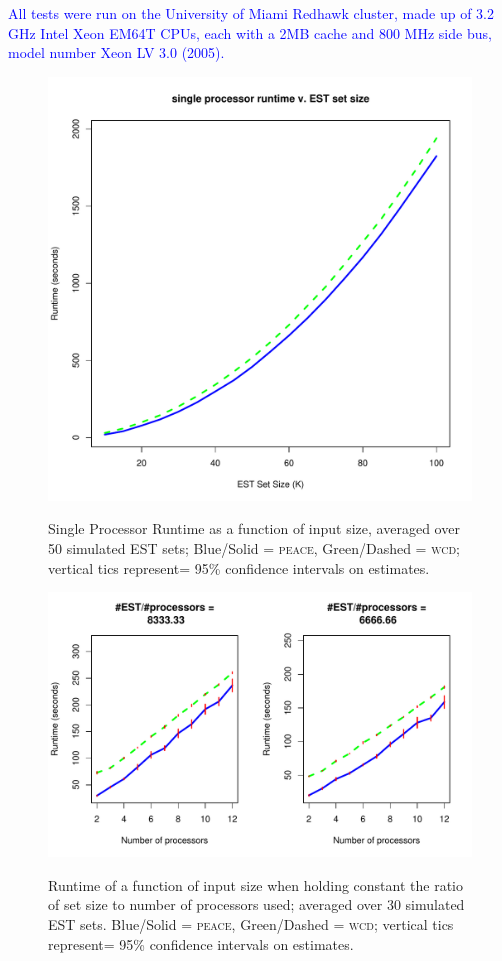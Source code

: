 \documentclass[a4paper,12pt]{article}
\newcommand{\mc}[1]{\textcolor{blue}{#1}}
\begin{document}
\begin{appendix}
\mc{All tests were run on the University of Miami Redhawk cluster,
  made up of 3.2 GHz Intel Xeon EM64T CPUs, each with a 2MB cache and
  800 MHz side bus, model number Xeon LV 3.0 (2005).}

\begin{figure}[tbp]
\centerline{
\includegraphics[scale=0.35]{pics.d/seq_time.pdf}
\label{seq_runtime}
}
\caption{Single Processor Runtime as a function of input size,
  averaged over 50 simulated EST sets; Blue/Solid = \textsc{peace},
  Green/Dashed = \textsc{wcd}; vertical tics represent= 95\% confidence
  intervals on estimates.}
\end{figure}
\begin{figure}[tbp]
\centerline{
\includegraphics[scale=0.5]{pics.d/par_time.pdf}
\label{par_runtime}
}
\caption{Runtime of a function of input size when holding constant the
  ratio of set size to number of processors used; averaged over 30
  simulated EST sets.  Blue/Solid = \textsc{peace}, Green/Dashed = \textsc{wcd};
  vertical tics represent= 95\% confidence intervals on estimates.}
\end{figure}


\end{appendix}
\end{document}
